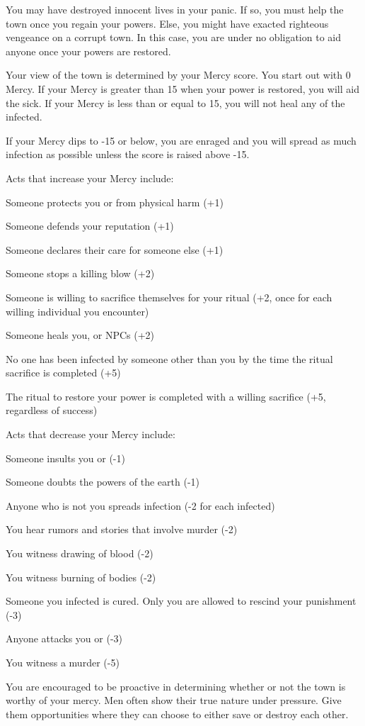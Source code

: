 \documentclass[green]{Pestilence}
\begin{document}
\name{\gMercy{}}

You may have destroyed innocent lives in your panic. If so, you must help the town once you regain your powers. Else, you might have exacted righteous vengeance on a corrupt town. In this case, you are under no obligation to aid anyone once your powers are restored.

Your view of the town is determined by your Mercy score. You start out with 0 Mercy. If your Mercy is greater than 15 when your power is restored, you will aid the sick. If your Mercy is less than or equal to 15, you will not heal any of the infected. 

If your Mercy dips to -15 or below, you are enraged and you will spread as much infection as possible unless the score is raised above -15.

Acts that increase your Mercy include:

\begin{itemz}
	\item Someone protects you or \cShaman{} from physical harm (+1)
	\item Someone defends your reputation (+1)
	\item Someone declares their care for someone else (+1)
	\item Someone stops a killing blow (+2)
	\item Someone is willing to sacrifice themselves for your ritual (+2, once for each willing individual you encounter)
	\item Someone heals you, \cShaman{} or NPCs (+2)
	\item No one has been infected by someone other than you by the time the ritual sacrifice is completed (+5)
	\item The ritual to restore your power is completed with a willing sacrifice (+5, regardless of success)
\end{itemz}

Acts that decrease your Mercy include:

\begin{itemz}
	\item Someone insults you or \cShaman{} (-1)
	\item Someone doubts the powers of the earth (-1)
	\item Anyone who is not you spreads infection (-2 for each infected)
	\item You hear rumors and stories that involve murder (-2)
	\item You witness drawing of blood (-2)
	\item You witness burning of bodies (-2)
	\item Someone you infected is cured. Only you are allowed to rescind your punishment (-3)
	\item Anyone attacks you or \cShaman{} (-3)
	\item You witness a murder (-5)
\end{itemz}

You are encouraged to be proactive in determining whether or not the town is worthy of your mercy. Men often show their true nature under pressure. Give them opportunities where they can choose to either save or destroy each other.
\end{document}
